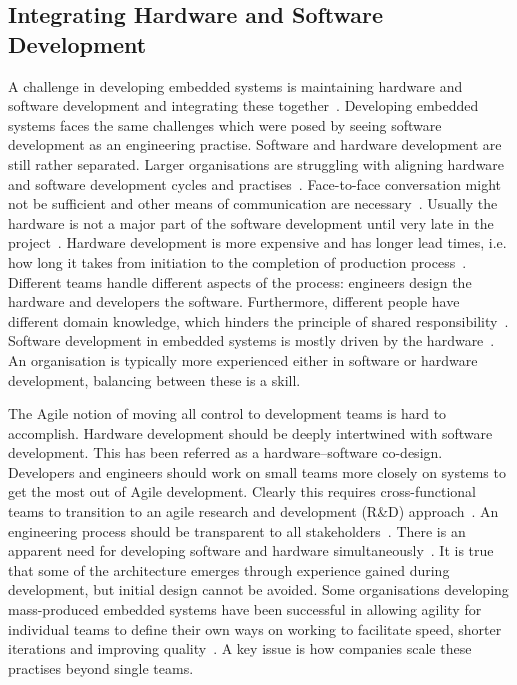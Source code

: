 \documentclass[english]{tktltiki2}
\begin{document}
\subsection{Integrating Hardware and Software Development}

A challenge in developing embedded systems is maintaining hardware and software development and integrating these together~\cite{EB12, EHS14}. Developing embedded systems faces the same challenges which were posed by seeing software development as an engineering practise. Software and hardware development are still rather separated. Larger organisations are struggling with aligning hardware and software development cycles and practises~\cite{EHS14}. Face-to-face conversation might not be sufficient and other means of communication are necessary~\cite{RA03}. Usually the hardware is not a major part of the software development until very late in the project~\cite{RA03}. Hardware development is more expensive and has longer lead times, i.e. how long it takes from initiation to the completion of production process~\cite{EHS14}. Different teams handle different aspects of the process: engineers design the hardware and developers the software. Furthermore, different people have different domain knowledge, which hinders the principle of shared responsibility~\cite{KRM13, EHS14}. Software development in embedded systems is mostly driven by the hardware~\cite{BE12}. An organisation is typically more experienced either in software or hardware development, balancing between these is a skill.

The Agile notion of moving all control to development teams is hard to accomplish. Hardware development should be deeply intertwined with software development. This has been referred as a hardware–software co-design. Developers and engineers should work on small teams more closely on systems to get the most out of Agile development. Clearly this requires cross-functional teams to transition to an agile research and development (R\&D) approach~\cite{HAB12, EHS14}. An engineering process should be transparent to all stakeholders~\cite{KRM13}. There is an apparent need for developing software and hardware simultaneously~\cite{RA03}. It is true that some of the architecture emerges through experience gained during development, but initial design cannot be avoided. Some organisations developing mass-produced embedded systems have been successful in allowing agility for individual teams to define their own ways on working to facilitate speed, shorter iterations and improving quality~\cite{EHS14}. A key issue is how companies scale these practises beyond single teams.
\end{document}
